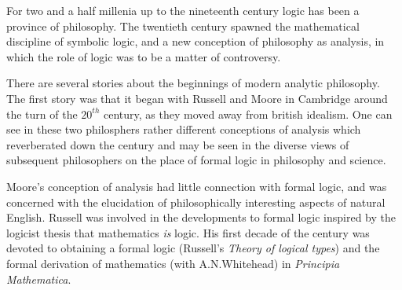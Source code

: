For two and a half millenia up to the nineteenth century logic has been a province of philosophy.
The twentieth century spawned the mathematical discipline of symbolic logic, and a new conception of philosophy as analysis, in which the role of logic was to be a matter of controversy.

There are several stories about the beginnings of modern analytic philosophy.
The first story was that it began with Russell and Moore in Cambridge around the turn of the $20^{th}$ century, as they moved away from british idealism.
One can see in these two philosphers rather different conceptions of analysis which reverberated down the century and may be seen in the diverse views of subsequent philosophers on the place of formal logic in philosophy and science.

Moore's conception of analysis had little connection with formal logic, and was concerned with the elucidation of philosophically interesting aspects of natural English.
Russell was involved in the developments to formal logic inspired by the logicist thesis that mathematics \emph{is} logic.
His first decade of the century was devoted to obtaining a formal logic (Russell's \emph{Theory of logical types}\cite{russell1908}) and the formal derivation of mathematics (with A.N.Whitehead) in \emph{Principia Mathematica}\cite{russell10}.
